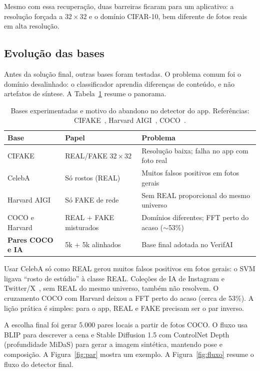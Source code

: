 \documentclass[12pt]{article}
\begin{document}
Mesmo com essa recuperação, duas barreiras ficaram para um aplicativo: a resolução forçada a $32{\times}32$ e o domínio CIFAR-10, bem diferente de fotos reais em alta resolução.

\subsection{Evolução das bases}

Antes da solução final, outras bases foram testadas. O problema comum foi o domínio desalinhado: o classificador aprendia diferenças de conteúdo, e não artefatos de síntese. A Tabela~\ref{tab:bases} resume o panorama.

\begin{table}[ht]
\centering
\small
\caption{Bases experimentadas e motivo do abandono no detector do app.
Referências: CIFAKE~\cite{bird2024cifake}, Harvard AIGI~\cite{harvardAIGI}, COCO~\cite{coco2017}.}
\label{tab:bases}
\renewcommand{\arraystretch}{1.25}
\begin{tabular}{@{}p{2.8cm}p{3.6cm}p{6.0cm}@{}}
\toprule
\textbf{Base} & \textbf{Papel} & \textbf{Problema} \\
\midrule
CIFAKE
  & REAL/FAKE $32{\times}32$
  & Resolução baixa; falha no app com foto real \\
CelebA
  & Só rostos (REAL)
  & Muitos falsos positivos em fotos gerais \\
Harvard AIGI
  & Só FAKE de rede
  & Sem REAL proporcional do mesmo universo \\
COCO e Harvard
  & REAL + FAKE misturados
  & Domínios diferentes; FFT perto do acaso ($\sim$53\%) \\
\textbf{Pares COCO e IA}
  & 5k + 5k alinhados
  & Base final adotada no VerifAI \\
\bottomrule
\end{tabular}
\end{table}

Usar CelebA só como REAL gerou muitos falsos positivos em fotos gerais: o SVM ligava ``rosto de estúdio'' à classe REAL. Coleções de IA de Instagram e Twitter/X~\cite{harvardAIGI}, sem REAL do mesmo universo, também não resolvem. O cruzamento COCO com Harvard deixou a FFT perto do acaso (cerca de 53\%). A lição prática é simples: para o app, REAL e FAKE precisam ser o par inverso.

A escolha final foi gerar 5{.}000 pares locais a partir de fotos COCO. O fluxo usa BLIP para descrever a cena e Stable Diffusion 1.5 com ControlNet Depth (profundidade MiDaS) para gerar a imagem sintética, mantendo pose e composição. A Figura~\ref{fig:par} mostra um exemplo. A Figura~\ref{fig:fluxo} resume o fluxo do detector final.
\end{document}
